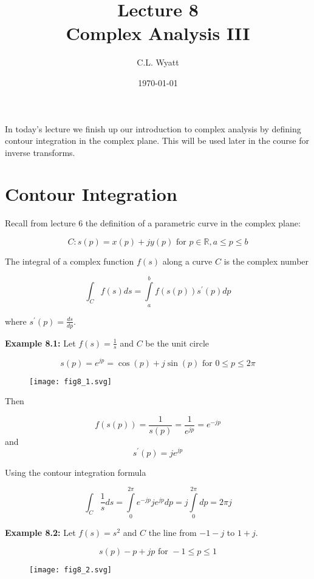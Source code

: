 \documentclass{article}
\begin{document}
\title{Lecture 8\\ Complex Analysis III}
\author{C.L. Wyatt}
\date{\today}
\maketitle

In today's lecture we finish up our introduction to complex analysis by defining contour integration in the complex plane. This will be used later in the course for inverse transforms.

\section{Contour Integration}

Recall from lecture 6 the definition of a parametric curve in the complex plane:

\[
C: s(p) = x(p) +jy(p) \text{ for } p\in\mathbb{R}, a \leq p \leq b
\]

The integral of a complex function $f(s)$ along a curve $C$ is the complex number

\[
\int_{C} f(s) ds = \int\limits_{a}^{b} f(s(p)) s^\prime(p) dp
\]

where $s^\prime(p) = \frac{ds}{dp}$.

\textbf{Example 8.1:} Let $f(s) = \frac{1}{s}$ and $C$ be the unit circle

\[
s(p) = e^{jp} = \cos(p) + j\sin(p) \text{ for } 0 \leq p \leq 2\pi
\]

\begin{figure}
  \centering
  \texttt{[image: fig8\_1.svg]}
\end{figure}

Then

\[
f\left(s(p)\right) = \frac{1}{s(p)} = \frac{1}{e^{jp}} = e^{-jp}
\]
and
\[
s^\prime(p) = je^{jp}
\]

Using the contour integration formula

\[
\int_C \frac{1}{s} ds = \int\limits_0^{2\pi} e^{-jp} j e^{jp} dp = j \int\limits_0^{2\pi} dp = 2\pi j 
\]

\textbf{Example 8.2:} Let $f(s) = s^2$ and $C$ the line from $-1-j$ to $1 + j$.

\[
s(p) - p + jp \text{ for } -1 \leq p \leq 1
\]

\begin{figure}
  \centering
  \texttt{[image: fig8\_2.svg]}
\end{figure}
\end{document}
